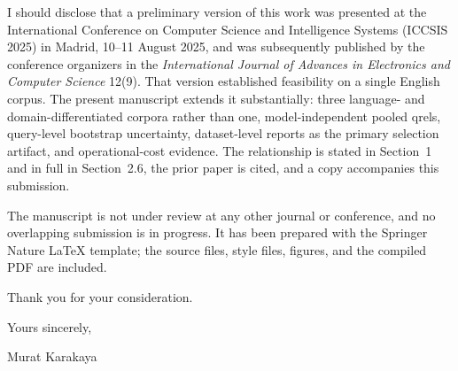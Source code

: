\documentclass[10pt,a4paper]{article}
\begin{document}
I should disclose that a preliminary version of this work was presented at the International
Conference on Computer Science and Intelligence Systems (ICCSIS 2025) in Madrid, 10--11 August
2025, and was subsequently published by the conference organizers in the \emph{International
Journal of Advances in Electronics and Computer Science} 12(9). That version established
feasibility on a single English corpus. The present manuscript extends it substantially: three
language- and domain-differentiated corpora rather than one, model-independent pooled qrels,
query-level bootstrap uncertainty, dataset-level reports as the primary selection artifact, and
operational-cost evidence. The relationship is stated in Section~1 and in full in Section~2.6,
the prior paper is cited, and a copy accompanies this submission.

The manuscript is not under review at any other journal or conference, and no overlapping
submission is in progress. It has been prepared with the Springer Nature \LaTeX{} template; the
source files, style files, figures, and the compiled PDF are included.

\medskip
\noindent
Thank you for your consideration.

\bigskip
\noindent
Yours sincerely,

\medskip
\noindent
Murat Karakaya
\end{document}
